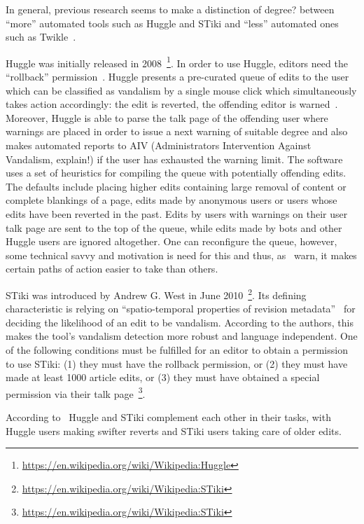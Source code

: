 In general, previous research seems to make a distinction of degree? between ``more'' automated tools such as Huggle and STiki and ``less'' automated ones such as Twikle~\cite{GeiHal2013}.

Huggle was initially released in 2008~\footnote{\url{https://en.wikipedia.org/wiki/Wikipedia:Huggle}}.
In order to use Huggle, editors need the ``rollback'' permission~\cite{HalRied2012}.
Huggle presents a pre-curated queue of edits to the user which can be classified as vandalism by a single mouse click which simultaneously takes action accordingly: the edit is reverted, the offending editor is warned~\cite{HalRied2012}.
Moreover, Huggle is able to parse the talk page of the offending user where warnings are placed in order to issue a next warning of suitable degree and also makes automated reports to AIV (Administrators Intervention Against Vandalism, explain!) if the user has exhausted the warning limit.
The software uses a set of heuristics for compiling the queue with potentially offending edits.
The defaults include placing higher edits containing large removal of content or complete blankings of a page, edits made by anonymous users or users whose edits have been reverted in the past.
Edits by users with warnings on their user talk page are sent to the top of the queue, while edits made by bots and other Huggle users are ignored altogether\cite{GeiRib2010}.
One can reconfigure the queue, however, some technical savvy and motivation is need for this and thus, as~\cite{GeiRib2010} warn, it makes certain paths of action easier to take than others.

STiki was introduced by Andrew G. West in June 2010~\footnote{\url{https://en.wikipedia.org/wiki/Wikipedia:STiki}}.
Its defining characteristic is relying on ``spatio-temporal properties of revision metadata''~\cite{WestKanLee2010} for deciding the likelihood of an edit to be vandalism.
According to the authors, this makes the tool's vandalism detection more robust and language independent.
One of the following conditions must be fulfilled for an editor to obtain a permission to use STiki:
(1) they must have the rollback permission, or
(2) they must have made at least 1000 article edits, or
(3) they must have obtained a special permission via their talk page~\footnote{\url{https://en.wikipedia.org/wiki/Wikipedia:STiki}}.

According to~\cite{GeiHal2013} Huggle and STiki complement each other in their tasks, with Huggle users making swifter reverts and STiki users taking care of older edits.

